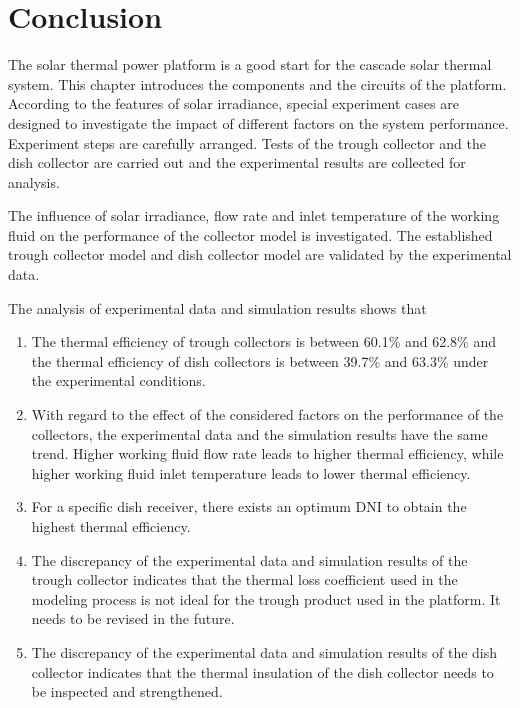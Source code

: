 \section{Conclusion}

The solar thermal power platform is a good start for the cascade solar thermal system. This chapter introduces the components and the circuits of the platform. According to the features of solar irradiance, special experiment cases are designed to investigate the impact of different factors on the system performance. Experiment steps are carefully arranged.
Tests of the trough collector and the dish collector are carried out and the experimental results are collected for analysis. 

The influence of solar irradiance, flow rate and inlet temperature of the working fluid on the performance of the collector model is investigated. The established trough collector model and dish collector model are validated by the experimental data.

The analysis of experimental data and simulation results shows that

\begin{enumerate}[label=(\arabic*)]
\item The thermal efficiency of trough collectors is between 60.1\% and 62.8\% and the thermal efficiency of dish collectors is between 39.7\% and 63.3\% under the experimental conditions.
\item With regard to the effect of the considered factors on the performance of the collectors, the experimental data and the simulation results have the same trend. Higher working fluid flow rate leads to higher thermal efficiency, while higher working fluid inlet temperature leads to lower thermal efficiency.
\item For a specific dish receiver, there exists an optimum DNI to obtain the highest thermal efficiency.
\item The discrepancy of the experimental data and simulation results of the trough collector indicates that the thermal loss coefficient used in the modeling process is not ideal for the trough product used in the platform. It needs to be revised in the future.
\item The discrepancy of the experimental data and simulation results of the dish collector indicates that the thermal insulation of the dish collector needs to be inspected and strengthened.
\end{enumerate}